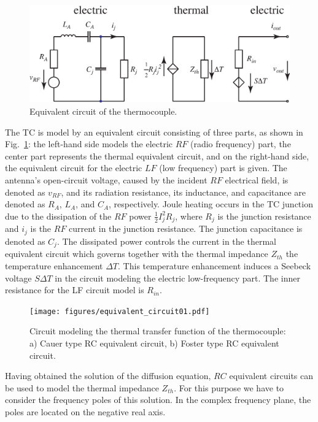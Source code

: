 \documentclass[journal]{IEEEtran}
\begin{document}
%
\begin{figure}[h]
\centerline{\includegraphics[width=0.95\columnwidth,clip]{figures/thermocouple_circuit03a.eps}}
\caption{Equivalent circuit of the thermocouple.}
\label{fig.circuit}
\end{figure}
%
The TC is model by an equivalent circuit consisting of three parts, as shown in Fig.~\ref{fig.circuit}: the left-hand side models the electric $RF$ (radio frequency) part, the center part represents the thermal equivalent circuit, and on the right-hand side, the equivalent circuit for the electric $LF$ (low frequency) part is given. The antenna's open-circuit voltage, caused by the incident $RF$ electrical field, is denoted as $v_{RF}$, and its radiation resistance, its inductance, and capacitance are denoted as $R_A$, $L_A$, and $C_A$, respectively. Joule heating occurs in the TC junction due to the dissipation of the $RF$ power $\frac{1}{2} I_j^2 R_j$, where $R_j$ is the junction resistance and $i_j$ is the $RF$ current in the junction resistance. The junction capacitance is denoted as $C_j$. The dissipated power controls the current in the thermal equivalent circuit which governs together with the thermal impedance $Z_{th}$ the temperature enhancement $\Delta T$. This temperature enhancement induces a Seebeck voltage $S \Delta T$ in the circuit modeling the electric low-frequency part. The inner resistance for the LF circuit model is $R_{in}$.
%
\begin{figure}[h]
\centerline{\texttt{[image: figures/equivalent\_circuit01.pdf]}}
\caption{Circuit modeling the thermal transfer function of the thermocouple: {a) Cauer type RC equivalent circuit, b) Foster type RC equivalent circuit.}}
\label{fig.RCcircuit}
\end{figure}
%
Having obtained the solution of the diffusion equation, $RC$ equivalent circuits can be used to model the thermal impedance $Z_{th}$. For this purpose we have to consider the frequency poles of this solution.  In the complex frequency plane, the poles are located on the negative real axis. 
\end{document}
